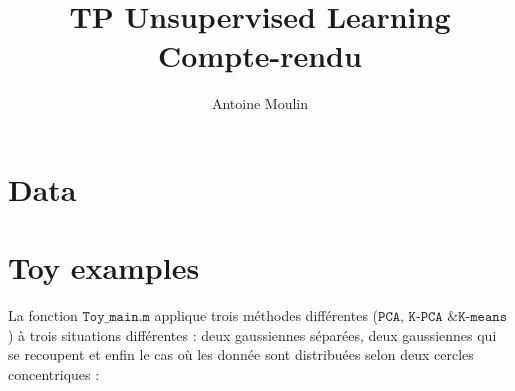 \documentclass[a4paper, 11pt]{article}
\title{TP Unsupervised Learning
Compte-rendu}
\author{Antoine Moulin}
\date{}
\begin{document}
\maketitle

\section{Data}

\section{Toy examples}

La fonction $\texttt{Toy\_main.m}$ applique trois méthodes différentes ($\texttt{PCA, K-PCA \& K-means}$) à trois situations différentes : deux gaussiennes séparées, deux gaussiennes qui se recoupent et enfin le cas où les donnée sont distribuées selon deux cercles concentriques :
\end{document}
